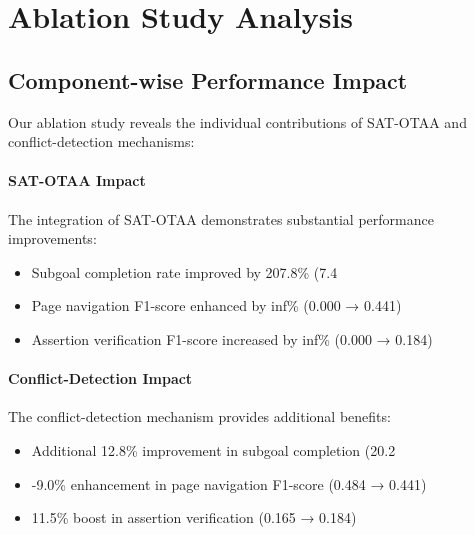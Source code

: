 
\section{Ablation Study Analysis}

\subsection{Component-wise Performance Impact}

Our ablation study reveals the individual contributions of SAT-OTAA and conflict-detection mechanisms:


\paragraph{SAT-OTAA Impact} The integration of SAT-OTAA demonstrates substantial performance improvements:
\begin{itemize}
    \item Subgoal completion rate improved by 207.8\% (7.4%
    \item Page navigation F1-score enhanced by inf\% (0.000 → 0.441)
    \item Assertion verification F1-score increased by inf\% (0.000 → 0.184)
\end{itemize}

\paragraph{Conflict-Detection Impact} The conflict-detection mechanism provides additional benefits:
\begin{itemize}
    \item Additional 12.8\% improvement in subgoal completion (20.2%
    \item -9.0\% enhancement in page navigation F1-score (0.484 → 0.441)
    \item 11.5\% boost in assertion verification (0.165 → 0.184)
\end{itemize}
